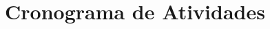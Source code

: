 \documentclass[11pt,oneside,brazil,hidelinks,article,sumario=tradicional,a4paper]{abntex2}
\begin{document}



\section{Cronograma de Atividades}


\end{document}
